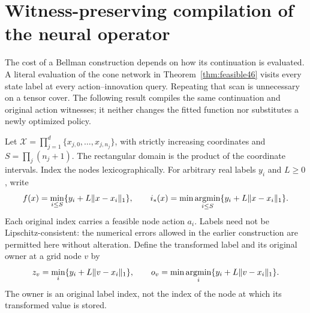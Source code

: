 \section{Witness-preserving compilation of the neural operator}\label{sec:compiler48}
The cost of a Bellman construction depends on how its continuation is evaluated. A literal evaluation of the cone network in Theorem~\ref{thm:feasible46} visits every state label at every action--innovation query. Repeating that scan is unnecessary on a tensor cover. The following result compiles the same continuation and original action witnesses; it neither changes the fitted function nor substitutes a newly optimized policy.

Let $\mathcal X=\prod_{j=1}^d\{x_{j,0},\ldots,x_{j,n_j}\}$, with strictly increasing coordinates and $S=\prod_j(n_j+1)$. The rectangular domain is the product of the coordinate intervals. Index the nodes lexicographically. For arbitrary real labels $y_i$ and $L\ge0$, write
\begin{equation}\label{eq:envelope48}
 f(x)=\min_{i\le S}\{y_i+L\|x-x_i\|_1\},\qquad
 i_*(x)=\min\mathop{\rm argmin}_{i\le S}\{y_i+L\|x-x_i\|_1\}.
\end{equation}
Each original index carries a feasible node action $a_i$. Labels need not be Lipschitz-consistent: the numerical errors allowed in the earlier construction are permitted here without alteration. Define the transformed label and its original owner at a grid node $v$ by
\begin{equation}\label{eq:transform48}
 z_v=\min_i\{y_i+L\|v-x_i\|_1\},\qquad
 o_v=\min\mathop{\rm argmin}_i\{y_i+L\|v-x_i\|_1\}.
\end{equation}
The owner is an original label index, not the index of the node at which its transformed value is stored.

